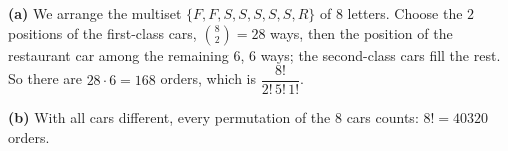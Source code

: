 \textbf{(a)} We arrange the multiset $\{F,F,S,S,S,S,S,R\}$ of $8$ letters. Choose the $2$ positions of the first-class cars, $\binom82=28$ ways, then the position of the restaurant car among the remaining $6$, $6$ ways; the second-class cars fill the rest. So there are $28\cdot6=\boxed{168}$ orders, which is $\dfrac{8!}{2!\,5!\,1!}$.

\textbf{(b)} With all cars different, every permutation of the $8$ cars counts: $8!=\boxed{40320}$ orders.
